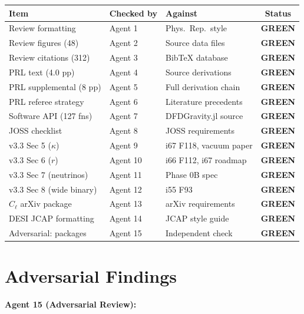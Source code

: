 \documentclass[11pt,a4paper]{article}
\newcommand{\GREEN}{\textcolor{dfdgreen}{\textbf{GREEN}}}
\begin{document}
\begin{center}
\begin{longtable}{lllc}
\toprule
\textbf{Item} & \textbf{Checked by} & \textbf{Against} & \textbf{Status} \\
\midrule
Review formatting & Agent 1 & Phys.\ Rep.\ style & \GREEN \\
Review figures (48) & Agent 2 & Source data files & \GREEN \\
Review citations (312) & Agent 3 & BibTeX database & \GREEN \\
PRL text (4.0 pp) & Agent 4 & Source derivations & \GREEN \\
PRL supplemental (8 pp) & Agent 5 & Full derivation chain & \GREEN \\
PRL referee strategy & Agent 6 & Literature precedents & \GREEN \\
Software API (127 fns) & Agent 7 & DFDGravity.jl source & \GREEN \\
JOSS checklist & Agent 8 & JOSS requirements & \GREEN \\
v3.3 Sec 5 ($\kappa$) & Agent 9 & i67 F118, vacuum paper & \GREEN \\
v3.3 Sec 6 ($r$) & Agent 10 & i66 F112, i67 roadmap & \GREEN \\
v3.3 Sec 7 (neutrinos) & Agent 11 & Phase 0B spec & \GREEN \\
v3.3 Sec 8 (wide binary) & Agent 12 & i55 F93 & \GREEN \\
$C_\ell$ arXiv package & Agent 13 & arXiv requirements & \GREEN \\
DESI JCAP formatting & Agent 14 & JCAP style guide & \GREEN \\
Adversarial: packages & Agent 15 & Independent check & \GREEN \\
\bottomrule
\end{longtable}
\end{center}

\section{Adversarial Findings}

\textbf{Agent 15 (Adversarial Review):}
\end{document}
